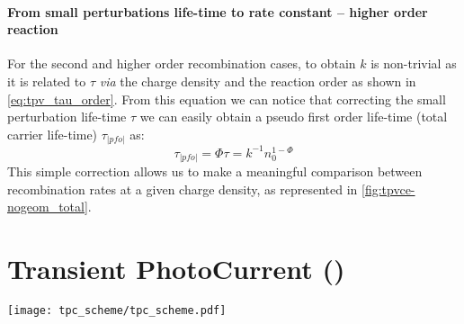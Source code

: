 		\paragraph{From small perturbations life\hyp{}time to rate constant -- higher order reaction}
		For the second and higher order recombination cases, to obtain $k$ is non\hyp{}trivial as it is related to $\tau$ \textsl{via} the charge density \cite{ORegan2007} and the reaction order \cite{Shuttle2008,Du2018,Barnes2011,Barnes2011a} as shown in \cref{eq:tpv_tau_order}.
		From this equation we can notice that correcting the small perturbation life\hyp{}time $\tau$ we can easily obtain a pseudo first order life\hyp{}time (total carrier life\hyp{}time) $\tau_|pfo|$ as:
		\begin{equation}\label{eq:tau_pfo}
			\tau_|pfo| = \Phi \tau = k^{-1} n_0^{1-\Phi}
		\end{equation}
		This simple correction allows us to make a meaningful comparison between recombination rates at a given charge density, as represented in \cref{fig:tpvce-nogeom_total}.

		\FloatBarrier
		\newpage
\section{Transient PhotoCurrent ()}\label{characterization_tpc}

	\begin{SCfigure}
		\centering
		\texttt{[image: tpc\_scheme/tpc\_scheme.pdf]}
		\label{fig:tpc_scheme}
	\end{SCfigure}

